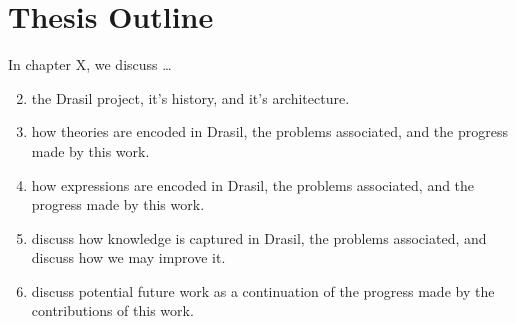 \section{Thesis Outline}

In chapter X, we discuss \dots
\begin{enumerate}
    \setcounter{enumi}{1}
    \item the Drasil project, it's history, and it's architecture.
    \item how theories are encoded in Drasil, the problems associated, and the
          progress made by this work.
    \item how expressions are encoded in Drasil, the problems associated, and
          the progress made by this work.
    \item discuss how knowledge is captured in Drasil, the problems associated,
          and discuss how we may improve it.
    \item discuss potential future work as a continuation of the progress made
          by the contributions of this work.
\end{enumerate}
